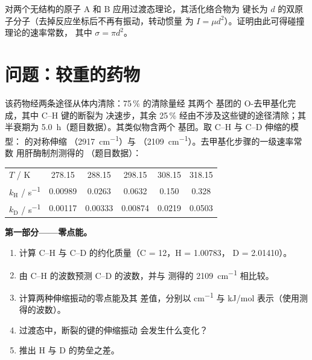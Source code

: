 \begin{exercise}[$\star\star\star$]\label{exo:b3:rate-theories:12}
对两个无结构的原子 A 和 B 应用过渡态理论，其活化络合物为
键长为 $d$ 的双原子分子（去掉反应坐标后不再有振动，转动惯量
为 $I = \mu d^2$）。证明由此可得碰撞理论的速率常数，
其中 $\sigma = \pi d^2$。
\end{exercise}

\section{问题：较重的药物}

\begin{problem}
\label{pb:b3:rate-theories:1}
该药物经两条途径从体内清除：75\,\% 的清除量经
其两个  基团的 O-去甲基化完成，其中 C--H 键的断裂为
决速步，其余 25\,\% 经由不涉及这些键的途径清除；其
半衰期为 \qty{5.0}{h}（题目数据）。其类似物含两个 
基团。取 C--H 与 C--D 伸缩的模型： 的对称伸缩
（\qty{2917}{cm^{-1}}）与 （\qty{2109}{cm^{-1}}）。去甲基化步骤的一级速率常数
用肝酶制剂测得的
（题目数据）：
\begin{center}\small
\begin{tabular}{lccccc}
\hline
$T$ / K & 278.15 & 288.15 & 298.15 & 308.15 & 318.15 \\
$k_{\mathrm H}$ / \unit{s^{-1}} & 0.00989 & 0.0263 & 0.0632 & 0.150 & 0.328 \\
$k_{\mathrm D}$ / \unit{s^{-1}} & 0.00117 & 0.00333 & 0.00874 & 0.0219 & 0.0503 \\ \hline
\end{tabular}
\end{center}

\medskip\noindent\textbf{第一部分——零点能。}
\begin{enumerate}
  \item 计算 C--H 与 C--D 的约化质量（C = 12，H = 1.00783，
        D = 2.01410）。
  \item 由 C--H 的波数预测 C--D 的波数，并与
        测得的 \qty{2109}{cm^{-1}} 相比较。
  \item 计算两种伸缩振动的零点能及其
        差值，分别以 \unit{cm^{-1}} 与 \unit{kJ/mol} 表示（使用测得的波数）。
  \item 过渡态中，断裂的键的伸缩振动
        会发生什么变化？
  \item 推出 H 与 D 的势垒之差。
\end{enumerate}


\end{problem}
